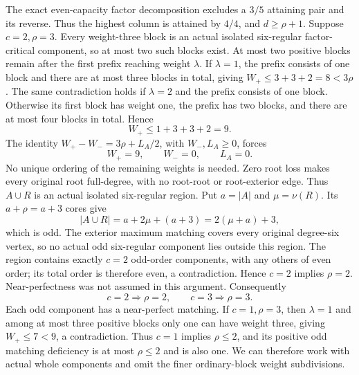 \documentclass[11pt,a4paper]{article}
\theoremstyle{definition}
\begin{document}
The exact even-capacity factor decomposition excludes a $3/5$ attaining pair and its reverse. Thus the highest column is attained by $4/4$, and $d\ge\rho+1$. Suppose $c=2,\rho=3$. Every weight-three block is an actual isolated six-regular factor-critical component, so at most two such blocks exist. At most two positive blocks remain after the first prefix reaching weight $\lambda$. If $\lambda=1$, the prefix consists of one block and there are at most three blocks in total, giving $W_+\le3+3+2=8<3\rho$. The same contradiction holds if $\lambda=2$ and the prefix consists of one block. Otherwise its first block has weight one, the prefix has two blocks, and there are at most four blocks in total. Hence
\[
W_+\le1+3+3+2=9.
\]
The identity $W_+-W_-=3\rho+L_A/2$, with $W_-,L_A\ge0$, forces
\[
W_+=9,\qquad W_-=0,\qquad L_A=0.
\]
No unique ordering of the remaining weights is needed. Zero root loss makes every original root full-degree, with no root-root or root-exterior edge. Thus $A\cup R$ is an actual isolated six-regular region. Put $a=|A|$ and $\mu=\nu(R)$. Its $a+\rho=a+3$ cores give
\[
|A\cup R|=a+2\mu+(a+3)=2(\mu+a)+3,
\]
which is odd. The exterior maximum matching covers every original degree-six vertex, so no actual odd six-regular component lies outside this region. The region contains exactly $c=2$ odd-order components, with any others of even order; its total order is therefore even, a contradiction. Hence $c=2$ implies $\rho=2$. Near-perfectness was not assumed in this argument.
Consequently
\[
 c=2\Longrightarrow\rho=2,\qquad
 c=3\Longrightarrow\rho=3.
\]
Each odd component has a near-perfect matching. If $c=1,\rho=3$, then $\lambda=1$ and among at most three positive blocks only one can have weight three, giving $W_+\le7<9$, a contradiction. Thus $c=1$ implies $\rho\le2$, and its positive odd matching deficiency is at most $\rho\le2$ and is also one. We can therefore work with actual whole components and omit the finer ordinary-block weight subdivisions.
\end{document}
